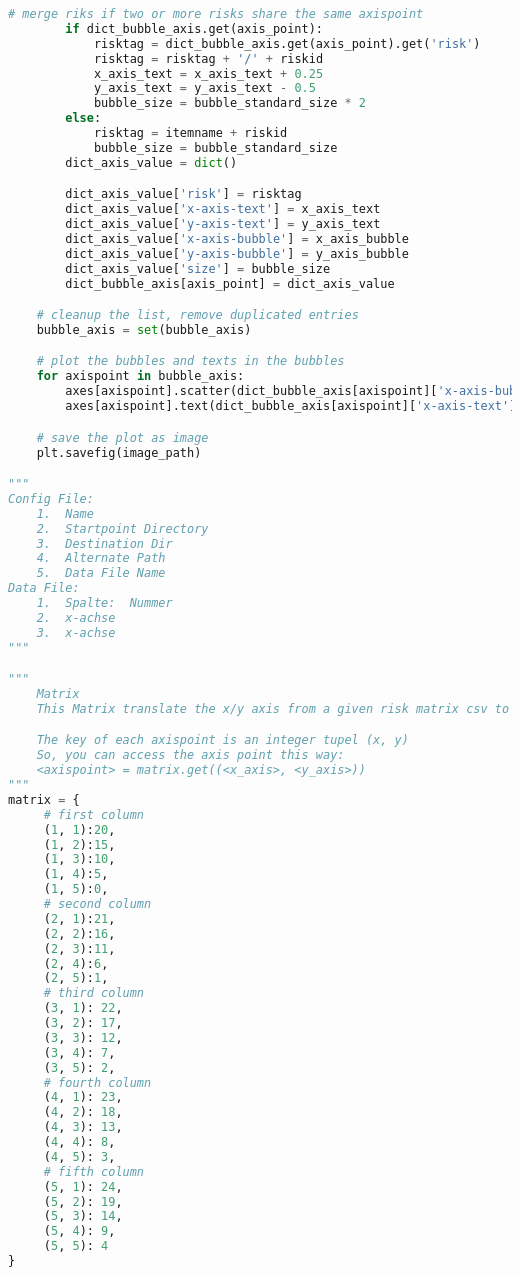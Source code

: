 \begin{lstlisting}[language=python, caption=Python LaTex - riskmatrix.py - Risxikomatrizen,captionpos=b,label={lst:riskmatrix},breaklines=true]
        # merge riks if two or more risks share the same axispoint
        if dict_bubble_axis.get(axis_point):
            risktag = dict_bubble_axis.get(axis_point).get('risk')
            risktag = risktag + '/' + riskid
            x_axis_text = x_axis_text + 0.25
            y_axis_text = y_axis_text - 0.5
            bubble_size = bubble_standard_size * 2
        else:
            risktag = itemname + riskid
            bubble_size = bubble_standard_size
        dict_axis_value = dict()

        dict_axis_value['risk'] = risktag
        dict_axis_value['x-axis-text'] = x_axis_text
        dict_axis_value['y-axis-text'] = y_axis_text
        dict_axis_value['x-axis-bubble'] = x_axis_bubble
        dict_axis_value['y-axis-bubble'] = y_axis_bubble
        dict_axis_value['size'] = bubble_size
        dict_bubble_axis[axis_point] = dict_axis_value

    # cleanup the list, remove duplicated entries
    bubble_axis = set(bubble_axis)

    # plot the bubbles and texts in the bubbles
    for axispoint in bubble_axis:
        axes[axispoint].scatter(dict_bubble_axis[axispoint]['x-axis-bubble'], dict_bubble_axis[axispoint]['y-axis-bubble'], dict_bubble_axis[axispoint]['size'], alpha=1)
        axes[axispoint].text(dict_bubble_axis[axispoint]['x-axis-text'], dict_bubble_axis[axispoint]['y-axis-text'], s=dict_bubble_axis[axispoint]['risk'], va='bottom', ha='center')

    # save the plot as image
    plt.savefig(image_path)

"""
Config File:
    1.  Name
    2.  Startpoint Directory
    3.  Destination Dir
    4.  Alternate Path
    5.  Data File Name
Data File:
    1.  Spalte:  Nummer
    2.  x-achse
    3.  x-achse
"""

"""
    Matrix
    This Matrix translate the x/y axis from a given risk matrix csv to the axispoint.

    The key of each axispoint is an integer tupel (x, y)
    So, you can access the axis point this way:
    <axispoint> = matrix.get((<x_axis>, <y_axis>))
"""
matrix = {
     # first column
     (1, 1):20,
     (1, 2):15,
     (1, 3):10,
     (1, 4):5,
     (1, 5):0,
     # second column
     (2, 1):21,
     (2, 2):16,
     (2, 3):11,
     (2, 4):6,
     (2, 5):1,
     # third column
     (3, 1): 22,
     (3, 2): 17,
     (3, 3): 12,
     (3, 4): 7,
     (3, 5): 2,
     # fourth column
     (4, 1): 23,
     (4, 2): 18,
     (4, 3): 13,
     (4, 4): 8,
     (4, 5): 3,
     # fifth column
     (5, 1): 24,
     (5, 2): 19,
     (5, 3): 14,
     (5, 4): 9,
     (5, 5): 4
}


\end{lstlisting}
